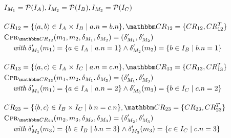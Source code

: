 \begin{align*}
    & 
    \metamodelinstanceset{M}{1} = \mathcal{P}(\metamodelinstances{\class{A}{}}), %
    \metamodelinstanceset{M}{2} = \mathcal{P}(\metamodelinstances{\class{B}{}}), %
    \metamodelinstanceset{M}{3} = \mathcal{P}(\metamodelinstances{\class{C}{}}) \\[1em]
    &
    \consistencyrelation{CR}{12} = \setted{\tupled{a,b} \in \metamodelinstances{\class{A}{}} \times \metamodelinstances{\class{B}{}} \mid a.n = b.n}, \consistencyrelationset{CR}_{12} = \setted{\consistencyrelation{CR}{12}, \consistencyrelation{CR}{12}^T} \\
    &
    \consistencypreservationrule{\consistencyrelationset{CR}_{12}}(\model{m}{1}, \model{m}{2}, \change{\metamodel{M}{1}}, \change{\metamodel{M}{2}}) = (\change{\metamodel{M}{1}}', \change{\metamodel{M}{2}}') \\
    & \formulaskip
        \mathtext{with} \change{\metamodel{M}{1}}'(\model{m}{1}) = \setted{a \in \metamodelinstances{\class{A}{}} \mid a.n = 1} \land \change{\metamodel{M}{2}}'(\model{m}{2}) = \setted{b \in \metamodelinstances{\class{B}{}} \mid b.n = 1} \\[1em]
    &
    \consistencyrelation{CR}{13} = \setted{\tupled{a,c} \in \metamodelinstances{\class{A}{}} \times \metamodelinstances{\class{C}{}} \mid a.n = c.n}, \consistencyrelationset{CR}_{13} = \setted{\consistencyrelation{CR}{13}, \consistencyrelation{CR}{13}^T} \\
    &
    \consistencypreservationrule{\consistencyrelationset{CR}_{13}}(\model{m}{1}, \model{m}{2}, \change{\metamodel{M}{1}}, \change{\metamodel{M}{3}}) = (\change{\metamodel{M}{1}}', \change{\metamodel{M}{3}}') \\
    & \formulaskip
        \mathtext{with} \change{\metamodel{M}{1}}'(\model{m}{1}) = \setted{a \in \metamodelinstances{\class{A}{}} \mid a.n = 2} \land \change{\metamodel{M}{3}}'(\model{m}{3}) = \setted{b \in \metamodelinstances{\class{C}{}} \mid c.n = 2} \\[1em]
    &
    \consistencyrelation{CR}{23} = \setted{\tupled{b,c} \in \metamodelinstances{\class{B}{}} \times \metamodelinstances{\class{C}{}} \mid b.n = c.n}, \consistencyrelationset{CR}_{23} = \setted{\consistencyrelation{CR}{23}, \consistencyrelation{CR}{23}^T} \\
    &
    \consistencypreservationrule{\consistencyrelationset{CR}_{23}}(\model{m}{2}, \model{m}{3}, \change{\metamodel{M}{2}}, \change{\metamodel{M}{3}}) = (\change{\metamodel{M}{2}}', \change{\metamodel{M}{3}}') \\
    & \formulaskip
        \mathtext{with} \change{\metamodel{M}{2}}'(\model{m}{3}) = \setted{b \in \metamodelinstances{\class{B}{}} \mid b.n = 3} \land \change{\metamodel{M}{3}}'(\model{m}{3}) = \setted{c \in \metamodelinstances{\class{C}{}} \mid c.n = 3}
\end{align*}

